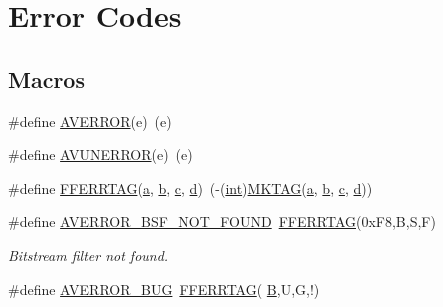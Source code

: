 \hypertarget{group__lavu__error}{}\section{Error Codes}
\label{group__lavu__error}
\subsection*{Macros}
\begin{DoxyCompactItemize}
\item 
\#define \hyperlink{group__lavu__error_gae4bb6f165973d09584e0ec0f335f69ca}{A\+V\+E\+R\+R\+OR}(e)~(e)
\item 
\#define \hyperlink{group__lavu__error_ga025dbb21a4a9789dfb37a2b78f241026}{A\+V\+U\+N\+E\+R\+R\+OR}(e)~(e)
\item 
\#define \hyperlink{group__lavu__error_gacfc46235e91e0770b94f7918013a1034}{F\+F\+E\+R\+R\+T\+AG}(\hyperlink{rfft2d_test_m_l_8m_a4124bc0a9335c27f086f24ba207a4912}{a},  \hyperlink{convtest_8m_a21ad0bd836b90d08f4cf640b4c298e7c}{b},  \hyperlink{rfft2d_test_m_l_8m_ae0323a9039add2978bf5b49550572c7c}{c},  \hyperlink{poly-fir_8h_a2530554172d8629149ec56816eeaa947}{d})~(-\/(\hyperlink{xmltok_8h_a5a0d4a5641ce434f1d23533f2b2e6653}{int})\hyperlink{ffmpeg_2libavutil_2common_8h_a19c68e2b5efcbab914d79db1e4fee734}{M\+K\+T\+AG}(\hyperlink{rfft2d_test_m_l_8m_a4124bc0a9335c27f086f24ba207a4912}{a}, \hyperlink{convtest_8m_a21ad0bd836b90d08f4cf640b4c298e7c}{b}, \hyperlink{rfft2d_test_m_l_8m_ae0323a9039add2978bf5b49550572c7c}{c}, \hyperlink{poly-fir_8h_a2530554172d8629149ec56816eeaa947}{d}))
\item 
\#define \hyperlink{group__lavu__error_ga586e134e9dad8f57a218b2cd8734b601}{A\+V\+E\+R\+R\+O\+R\+\_\+\+B\+S\+F\+\_\+\+N\+O\+T\+\_\+\+F\+O\+U\+ND}~\hyperlink{group__lavu__error_gacfc46235e91e0770b94f7918013a1034}{F\+F\+E\+R\+R\+T\+AG}(0x\+F8,\textquotesingle{}\+B\textquotesingle{},\textquotesingle{}\+S\textquotesingle{},\textquotesingle{}\+F\textquotesingle{})
\begin{DoxyCompactList}\small\item\em Bitstream filter not found. \end{DoxyCompactList}\item 
\#define \hyperlink{group__lavu__error_gaa102cde7ec5acbc099c3bcbb58556a18}{A\+V\+E\+R\+R\+O\+R\+\_\+\+B\+UG}~\hyperlink{group__lavu__error_gacfc46235e91e0770b94f7918013a1034}{F\+F\+E\+R\+R\+T\+AG}( \textquotesingle{}\hyperlink{libnyquist_2nyquist_2nyqsrc_2add_8c_a111da81ae5883147168bbb8366377b10}{B}\textquotesingle{},\textquotesingle{}U\textquotesingle{},\textquotesingle{}G\textquotesingle{},\textquotesingle{}!\textquotesingle{})

\end{DoxyCompactItemize}

